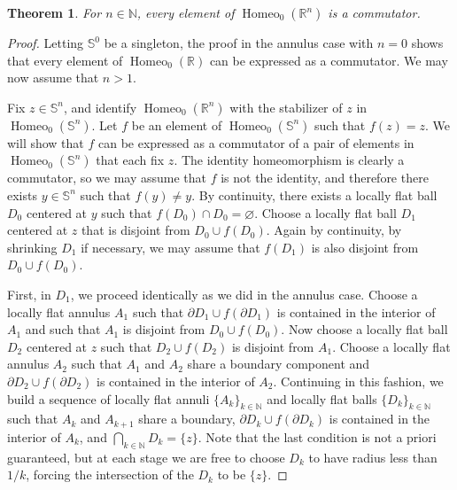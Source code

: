 \documentclass[microtype]{gtpart}
\newcommand{\br}{\mathbb{R}}
\newcommand{\bn}{\mathbb N}
\DeclareMathOperator{\Homeo}{Homeo}
\newtheorem{Thm}{Theorem}[section]
\theoremstyle{definition}
\numberwithin{equation}{section}
\begin{document}

\begin{Thm}
For \( n \in \bn \), every element of \( \Homeo_0(\mathbb R^n) \) is a commutator. 
\end{Thm}

\begin{proof}
Letting \( \mathbb S^0 \) be a singleton, the proof  in the annulus case with \( n = 0 \) shows that every element of \( \Homeo_0(\br) \) can be expressed as a commutator. 
We may now assume that \( n > 1 \).

Fix \( z \in \mathbb S^n \), and identify \( \Homeo_0(\br^n) \) with the stabilizer of \( z \) in \( \Homeo_0( \mathbb S^n) \).  
Let \( f \) be an element of \( \Homeo_0(\mathbb S^n) \) such that \( f(z) = z \). 
We will show that \( f \) can be expressed as a commutator of a pair of elements in \( \Homeo_0(\mathbb S^n) \) that each fix \( z \). 
The identity homeomorphism is clearly a commutator, so we may assume that \( f \) is not the identity, and therefore there exists \( y \in \mathbb S^n \) such that \( f(y) \neq y \). 
By continuity, there exists a locally flat ball \( D_0 \) centered at \( y \) such that \( f(D_0) \cap D_0 = \varnothing \). 
Choose a locally flat ball \( D_1 \) centered at \( z \) that is disjoint from \( D_0 \cup f(D_0) \). 
Again by continuity, by shrinking \( D_1 \) if necessary, we may assume that \( f(D_1) \) is also disjoint from \( D_0 \cup f(D_0) \). 

First, in \( D_1 \), we proceed identically as we did in the annulus case. 
Choose a locally flat  annulus \( A_1 \) such that \( \partial D_1 \cup f(\partial D_1) \) is contained in the interior of \( A_1 \) and such that \( A_1 \) is disjoint from \( D_0 \cup f(D_0) \). 
Now choose a locally flat ball \( D_{2} \) centered at \( z \) such that \( D_2 \cup f(D_2) \) is disjoint from \( A_1 \). 
Choose a locally flat  annulus \( A_2 \) such that \( A_1 \) and \( A_2 \) share a boundary component and \( \partial D_2 \cup f(\partial D_2) \) is contained in the interior of \( A_2 \). 
Continuing in this fashion, we build a sequence of locally flat  annuli \( \{ A_k\}_{k\in\bn} \) and locally flat balls \( \{D_k\}_{k\in\bn} \) such that \( A_k \) and \( A_{k+1} \) share a boundary, \( \partial D_k \cup f(\partial D_k) \) is contained in the interior of \( A_k \), and \( \bigcap_{k\in\bn} D_k = \{ z \} \). 
Note that the last condition is not a priori guaranteed, but at each stage we are free to choose \( D_k \) to have radius less than \( 1/k \), forcing the intersection of the \( D_k \) to be \( \{z\} \). 


\end{proof}
\end{document}
